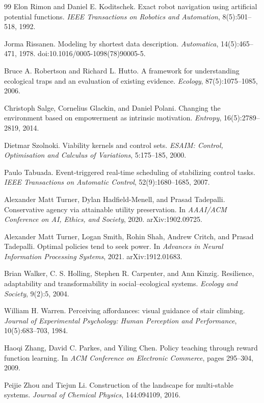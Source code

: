 \documentclass[11pt,a4paper]{article}
\theoremstyle{remark}
\begin{document}
\begin{thebibliography}{99}
Elon Rimon and Daniel E. Koditschek.
\newblock Exact robot navigation using artificial potential functions.
\newblock \emph{IEEE Transactions on Robotics and Automation}, 8(5):501--518, 1992.

Jorma Rissanen.
\newblock Modeling by shortest data description.
\newblock \emph{Automatica}, 14(5):465--471, 1978.
\newblock doi:10.1016/0005-1098(78)90005-5.

Bruce A. Robertson and Richard L. Hutto.
\newblock A framework for understanding ecological traps and an evaluation of existing evidence.
\newblock \emph{Ecology}, 87(5):1075--1085, 2006.

Christoph Salge, Cornelius Glackin, and Daniel Polani.
\newblock Changing the environment based on empowerment as intrinsic motivation.
\newblock \emph{Entropy}, 16(5):2789--2819, 2014.

Dietmar Szolnoki.
\newblock Viability kernels and control sets.
\newblock \emph{ESAIM: Control, Optimisation and Calculus of Variations}, 5:175--185, 2000.

Paulo Tabuada.
\newblock Event-triggered real-time scheduling of stabilizing control tasks.
\newblock \emph{IEEE Transactions on Automatic Control}, 52(9):1680--1685, 2007.

Alexander Matt Turner, Dylan Hadfield-Menell, and Prasad Tadepalli.
\newblock Conservative agency via attainable utility preservation.
\newblock In \emph{AAAI/ACM Conference on AI, Ethics, and Society}, 2020. arXiv:1902.09725.

Alexander Matt Turner, Logan Smith, Rohin Shah, Andrew Critch, and Prasad Tadepalli.
\newblock Optimal policies tend to seek power.
\newblock In \emph{Advances in Neural Information Processing Systems}, 2021. arXiv:1912.01683.

Brian Walker, C. S. Holling, Stephen R. Carpenter, and Ann Kinzig.
\newblock Resilience, adaptability and transformability in social--ecological systems.
\newblock \emph{Ecology and Society}, 9(2):5, 2004.

William H. Warren.
\newblock Perceiving affordances: visual guidance of stair climbing.
\newblock \emph{Journal of Experimental Psychology: Human Perception and Performance}, 10(5):683--703, 1984.

Haoqi Zhang, David C. Parkes, and Yiling Chen.
\newblock Policy teaching through reward function learning.
\newblock In \emph{ACM Conference on Electronic Commerce}, pages 295--304, 2009.

Peijie Zhou and Tiejun Li.
\newblock Construction of the landscape for multi-stable systems.
\newblock \emph{Journal of Chemical Physics}, 144:094109, 2016.

\end{thebibliography}
\end{document}
